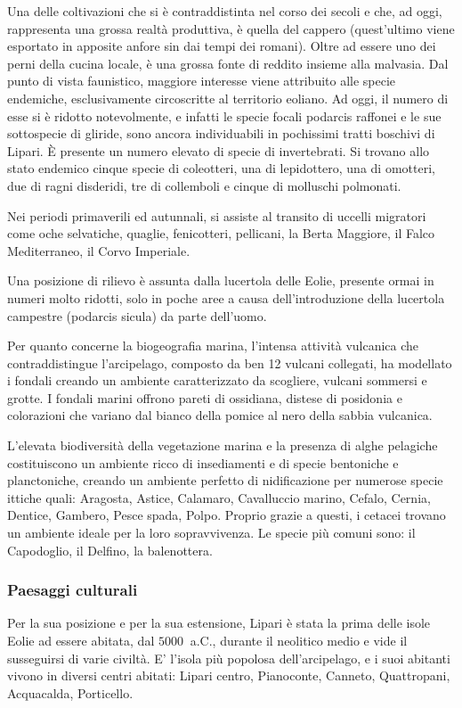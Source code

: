 \documentclass[fleqn,11pt]{SelfArx} %
\begin{document}
Una delle coltivazioni che si è contraddistinta nel corso dei secoli e che, ad oggi, rappresenta una grossa realtà produttiva, è quella del cappero (quest'ultimo viene esportato in apposite anfore sin dai tempi dei romani). Oltre ad essere uno dei perni della cucina locale, è una grossa fonte di reddito insieme alla malvasia.
Dal punto di vista faunistico, maggiore interesse viene attribuito alle specie endemiche, esclusivamente circoscritte al territorio eoliano. Ad oggi, il numero di esse si è ridotto notevolmente, e infatti le specie focali podarcis raffonei e le sue sottospecie di gliride, sono ancora individuabili in pochissimi tratti boschivi di Lipari. È presente un numero elevato di specie di invertebrati. Si trovano allo stato endemico cinque specie di coleotteri, una di lepidottero, una di omotteri, due di ragni disderidi, tre di collemboli e cinque di molluschi polmonati.

Nei periodi primaverili ed autunnali, si assiste al transito di uccelli migratori come oche selvatiche, quaglie, fenicotteri, pellicani, la Berta Maggiore, il Falco Mediterraneo, il Corvo Imperiale.

Una posizione di rilievo è assunta dalla lucertola delle Eolie, presente ormai in numeri molto ridotti, solo in poche aree a causa dell'introduzione della lucertola campestre (podarcis sicula) da parte dell'uomo.

Per quanto concerne la biogeografia marina, l'intensa attività vulcanica che contraddistingue l'arcipelago, composto da ben 12 vulcani collegati, ha modellato i fondali creando un ambiente caratterizzato da scogliere, vulcani sommersi e grotte. I fondali marini offrono pareti di ossidiana, distese di posidonia e colorazioni che variano dal bianco della pomice al nero della sabbia vulcanica.

L'elevata biodiversità della vegetazione marina e la presenza di alghe pelagiche costituiscono un ambiente ricco di insediamenti e di specie bentoniche e planctoniche, creando un ambiente perfetto di nidificazione per numerose specie ittiche quali: Aragosta, Astice, Calamaro, Cavalluccio marino, Cefalo, Cernia, Dentice, Gambero, Pesce spada, Polpo. Proprio grazie a questi, i cetacei trovano un ambiente ideale per la loro sopravvivenza. Le specie più comuni sono: il Capodoglio, il Delfino, la balenottera.


\subsubsection{Paesaggi culturali}
Per la sua posizione e per la sua estensione, Lipari è stata la prima delle isole Eolie ad essere abitata, dal \(\SI{5000}{}\) a.C., durante il neolitico medio e vide il susseguirsi di varie civiltà. E' l'isola più popolosa dell'arcipelago, e i suoi abitanti vivono in diversi centri abitati: Lipari centro, Pianoconte, Canneto, Quattropani, Acquacalda, Porticello.
\end{document}
